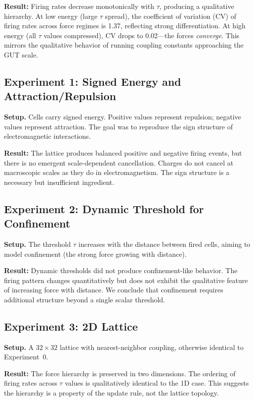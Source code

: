 \documentclass[letterpaper,12pt]{article}
\begin{document}
\textbf{Result: \checkmark} Firing rates decrease monotonically with $\tau$, producing a qualitative hierarchy. At low energy (large $\tau$ spread), the coefficient of variation (CV) of firing rates across force regimes is 1.37, reflecting strong differentiation. At high energy (all $\tau$ values compressed), CV drops to 0.02---the forces \emph{converge}. This mirrors the qualitative behavior of running coupling constants approaching the GUT scale.

\subsection{Experiment 1: Signed Energy and Attraction/Repulsion}

\textbf{Setup.} Cells carry signed energy. Positive values represent repulsion; negative values represent attraction. The goal was to reproduce the sign structure of electromagnetic interactions.

\textbf{Result: \texttimes} The lattice produces balanced positive and negative firing events, but there is no emergent scale-dependent cancellation. Charges do not cancel at macroscopic scales as they do in electromagnetism. The sign structure is a necessary but insufficient ingredient.

\subsection{Experiment 2: Dynamic Threshold for Confinement}

\textbf{Setup.} The threshold $\tau$ increases with the distance between fired cells, aiming to model confinement (the strong force growing with distance).

\textbf{Result: \texttimes} Dynamic thresholds did not produce confinement-like behavior. The firing pattern changes quantitatively but does not exhibit the qualitative feature of increasing force with distance. We conclude that confinement requires additional structure beyond a single scalar threshold.

\subsection{Experiment 3: 2D Lattice}

\textbf{Setup.} A $32 \times 32$ lattice with nearest-neighbor coupling, otherwise identical to Experiment~0.

\textbf{Result: \checkmark} The force hierarchy is preserved in two dimensions. The ordering of firing rates across $\tau$ values is qualitatively identical to the 1D case. This suggests the hierarchy is a property of the update rule, not the lattice topology.
\end{document}
